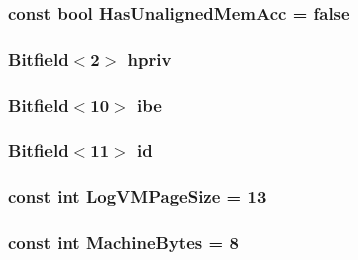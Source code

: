 \label{namespaceSparcISA_aabd6fa5889c9ccc124dfd4a984046f6f}
\hypertarget{namespaceSparcISA_a1c3adbc67ce574fe545e332d3bc677be}{
\subsubsection[{HasUnalignedMemAcc}]{\setlength{\rightskip}{0pt plus 5cm}const bool {\bf HasUnalignedMemAcc} = false}}
\label{namespaceSparcISA_a1c3adbc67ce574fe545e332d3bc677be}
\hypertarget{namespaceSparcISA_a0ee6b47193187a7e02e4231aaa050d97}{
\subsubsection[{hpriv}]{\setlength{\rightskip}{0pt plus 5cm}Bitfield$<$2$>$ {\bf hpriv}}}
\label{namespaceSparcISA_a0ee6b47193187a7e02e4231aaa050d97}
\hypertarget{namespaceSparcISA_abdfad74473ff8fc48d79349b5243e166}{
\subsubsection[{ibe}]{\setlength{\rightskip}{0pt plus 5cm}Bitfield$<$10$>$ {\bf ibe}}}
\label{namespaceSparcISA_abdfad74473ff8fc48d79349b5243e166}
\hypertarget{namespaceSparcISA_a2b4cf644f5af9ebaec502fb09986f302}{
\subsubsection[{id}]{\setlength{\rightskip}{0pt plus 5cm}Bitfield$<$11$>$ {\bf id}}}
\label{namespaceSparcISA_a2b4cf644f5af9ebaec502fb09986f302}
\hypertarget{namespaceSparcISA_a554fef169d109a5ccb7ce0dd6a43e521}{
\subsubsection[{LogVMPageSize}]{\setlength{\rightskip}{0pt plus 5cm}const int {\bf LogVMPageSize} = 13}}
\label{namespaceSparcISA_a554fef169d109a5ccb7ce0dd6a43e521}
\hypertarget{namespaceSparcISA_a8f4ba87c53caab23396d3b86b672b0fb}{
\subsubsection[{MachineBytes}]{\setlength{\rightskip}{0pt plus 5cm}const int {\bf MachineBytes} = 8}}
